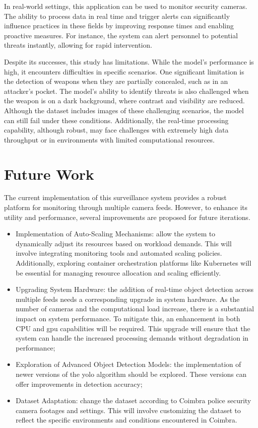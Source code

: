 In real-world settings, this application can be used to monitor security cameras. The ability to process data in 
real time and trigger alerts can significantly influence practices in these fields by improving response times and 
enabling proactive measures. For instance, the system can alert personnel to potential 
threats instantly, allowing for rapid intervention.

Despite its successes, this study has limitations. While the model's performance is high, it encounters difficulties in 
specific scenarios. One significant limitation is the detection of weapons when they are partially concealed, such as in 
an attacker's pocket. The model's ability to identify threats is also challenged when the weapon is on a dark background, 
where contrast and visibility are reduced. Although the dataset includes images of these challenging scenarios, the model 
can still fail under these conditions. Additionally, the real-time processing capability, although robust, may face 
challenges with extremely high data throughput or in environments with limited computational resources. 

\section{Future Work}
The current implementation of this surveillance system provides a robust platform for monitoring through multiple 
camera feeds. However, to enhance its utility and performance, several improvements are proposed for future iterations.

\begin{itemize}
    \item Implementation of Auto-Scaling Mechanisms: allow the system to 
    dynamically adjust its resources based on workload demands. This will involve integrating monitoring tools 
    and automated scaling policies.
    Additionally, exploring container orchestration platforms 
    like Kubernetes will be essential for managing resource allocation and scaling efficiently.
    \item Upgrading System Hardware: the addition of real-time object detection across multiple feeds needs a 
    corresponding upgrade in system hardware. As the number of cameras and the computational load increase, there is 
    a substantial impact on system performance. To mitigate this, an enhancement in both CPU and \ac{gpu} capabilities will 
    be required. This upgrade will ensure that the system can handle the increased processing demands without degradation 
    in performance;
    \item Exploration of Advanced Object Detection Models: the implementation of newer versions of the \ac{yolo} 
    algorithm should be explored. These versions can offer improvements in detection accuracy;
    \item Dataset Adaptation: change the dataset according to Coimbra police security camera footages and settings. This
     will involve customizing the dataset to reflect the specific environments and conditions encountered in Coimbra. 
\end{itemize}